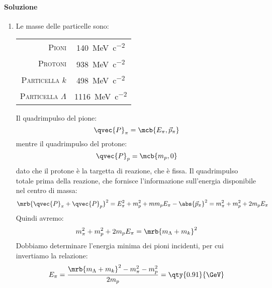 \begin{example}[]
  \paragraph{Soluzione}
  \begin{enumerate}
    \item Le masse delle particelle sono:
      \begin{table}[h!]
        \centering
        \begin{tabular}{r|c}
          \textsc{Pioni} & \qty{140}{\MeV \per c^2}
          \\
          \textsc{Protoni} & \qty{938}{\MeV \per c^2}
          \\
          \textsc{Particella $k$} & \qty{498}{\MeV \per c^2}
          \\
          \textsc{Particella $\Lambda$} & \qty{1116}{\MeV \per c^2}
        \end{tabular}
      \end{table}
      Il quadrimpulso del pione:
      \begin{equation}
        \qvec{P} _{\pi} = \mcb{E _{\pi}, \vec{p}_{\pi}}
      \end{equation}
      mentre il quadrimpulso del protone:
      \begin{equation}
        \qvec{P}_{p} = \mcb{m _{p}, 0}
      \end{equation}
      dato che il protone è la targetta di reazione, che è fissa.
      Il quadrimpulso totale prima della reazione, che fornisce l'informazione
      sull'energia disponibile nel centro di massa:
      \begin{equation}
        \mrb{\qvec{P}_{\pi} + \qvec{P}_{p}}^{2} = E _{\pi}^{2} + m _{p}^{2} + m
        m_p E _{\pi} - \abs{\vec{p}_{\pi}}^{2} = m _{\pi}^{2} + m _{p}^{2} + 2
        m_p E _{\pi}
      \end{equation}
      Quindi avremo:
      \begin{equation}
        m _{\pi}^{2} + m _{p}^{2} + 2 m_p E _{\pi} = \mrb{m _{\Lambda} + m
        _{k}}^{2}
      \end{equation}
      Dobbiamo determinare l'energia minima dei pioni incidenti, per cui
      invertiamo la relazione:
      \begin{equation}
        E _{\pi} = \frac{\mrb{m _{\Lambda} + m _{k}}^{2} - m _{\pi}^{2} - m
        _{p}^{2}}{2 m_p} = \qty{0.91}{\GeV}
      \end{equation}


\end{enumerate}
\end{example}
